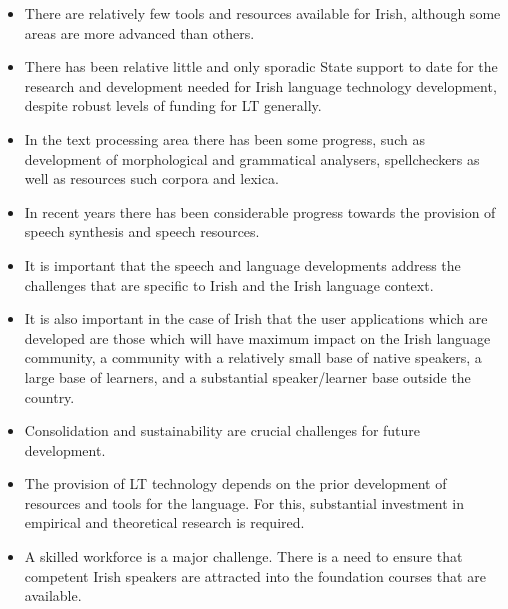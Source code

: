 \begin{multicols}{2}
\begin{itemize}
\item There are relatively few tools and resources available for Irish, although some areas are more advanced than others. 
\item There has been relative little and only sporadic State support to date for the research and development needed for Irish language technology development, despite robust levels of funding for LT generally.
\item In the text processing area there has been some progress, such as development of morphological and grammatical analysers, spellcheckers as well as resources such corpora and lexica.
\item In recent years there has been considerable progress towards the provision of speech synthesis and speech resources. 
\item It is important that the speech and language developments address  the challenges that are specific to Irish and the Irish language context. 
\item It is also important in the case of Irish that the user applications which are developed are those which will have maximum impact on the Irish language community, a community with a relatively small base of native speakers, a large base of learners, and a substantial speaker/learner base outside the country. 
\item Consolidation and sustainability are crucial challenges for future development. 
\item The provision of LT technology depends on the prior development of resources and tools for the language. For this, substantial investment in empirical and theoretical research is required.
\item A skilled workforce is a major challenge. There is a need to ensure that competent Irish speakers are attracted into the foundation courses that are available.
\end{itemize}


\end{multicols}
